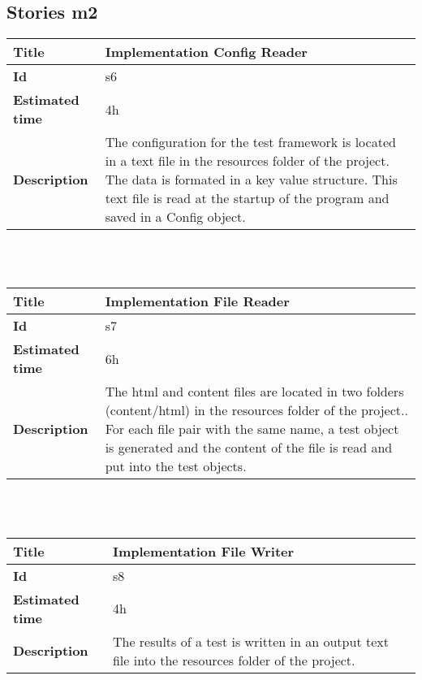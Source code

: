 \subsection {Stories m2}


    \begin{tabular}{ | p{4cm} | p{10cm} |}
    \hline
    \textbf{Title} & Implementation Config Reader \\ \hline
    \textbf{Id} & s6\\ \hline
    \textbf{Estimated time} & 4h \\ \hline
    \textbf{Description} & The configuration for the test framework is located in a text file in the resources folder of the project. The data is formated  in a key value structure. This text file is read at the startup of the program and saved in a Config object.\\ 
    \hline
    \end{tabular} \\\\


    \begin{tabular}{ | p{4cm} | p{10cm} |}
    \hline
    \textbf{Title} & Implementation File Reader \\ \hline
    \textbf{Id} & s7\\ \hline
    \textbf{Estimated time} & 6h \\ \hline
    \textbf{Description} & The html and content files are located in two folders (content/html) in the resources folder of the project.. For each file pair with the same name, a test object is generated and the content of the file is read and put into the test objects.\\ 
    \hline
    \end{tabular} \\\\


        \begin{tabular}{ | p{4cm} | p{10cm} |}
    \hline
    \textbf{Title} & Implementation File Writer \\ \hline
    \textbf{Id} & s8\\ \hline
    \textbf{Estimated time} & 4h \\ \hline
    \textbf{Description} & The results of a test is written in an output text file into the resources folder of the project.\\ 
    \hline
    \end{tabular} \\\\


